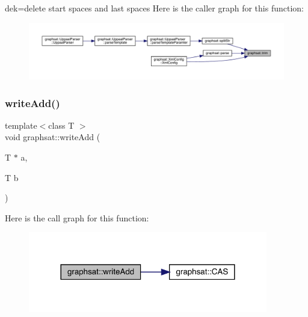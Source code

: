 dek=delete start spaces and last spaces Here is the caller graph for this function\+:
\nopagebreak
\begin{figure}[H]
\begin{center}
\leavevmode
\includegraphics[width=350pt]{namespacegraphsat_ae996ede22924c81a18a6697de7bcf9d5_icgraph}
\end{center}
\end{figure}
\mbox{\label{namespacegraphsat_a179cb1f1b573c4d71f0f1ac8199f3262}} 
\subsubsection{\texorpdfstring{writeAdd()}{writeAdd()}}
{\footnotesize\ttfamily template$<$class T $>$ \\
void graphsat\+::write\+Add (\begin{DoxyParamCaption}\item[{T $\ast$}]{a,  }\item[{T}]{b }\end{DoxyParamCaption})\hspace{0.3cm}{\ttfamily [inline]}}

Here is the call graph for this function\+:
\nopagebreak
\begin{figure}[H]
\begin{center}
\leavevmode
\includegraphics[width=296pt]{namespacegraphsat_a179cb1f1b573c4d71f0f1ac8199f3262_cgraph}
\end{center}
\end{figure}
\mbox{\label{namespacegraphsat_af93904918cd008fe84acebf0fec34ae3}} 
